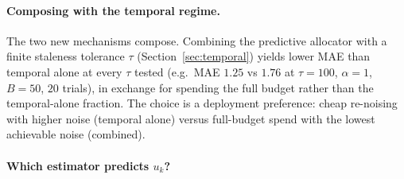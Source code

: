 \documentclass[sigconf,nonacm]{acmart}
\begin{document}
\paragraph{Composing with the temporal regime.}
The two new mechanisms compose. Combining the predictive allocator with a finite staleness tolerance $\tau$ (Section~\ref{sec:temporal}) yields lower MAE than temporal alone at every $\tau$ tested (e.g.\ MAE $1.25$ vs $1.76$ at $\tau=100$, $\alpha=1$, $B=50$, $20$ trials), in exchange for spending the full budget rather than the temporal-alone fraction. The choice is a deployment preference: cheap re-noising with higher noise (temporal alone) versus full-budget spend with the lowest achievable noise (combined).

\paragraph{Which estimator predicts $u_k$?}
\end{document}
